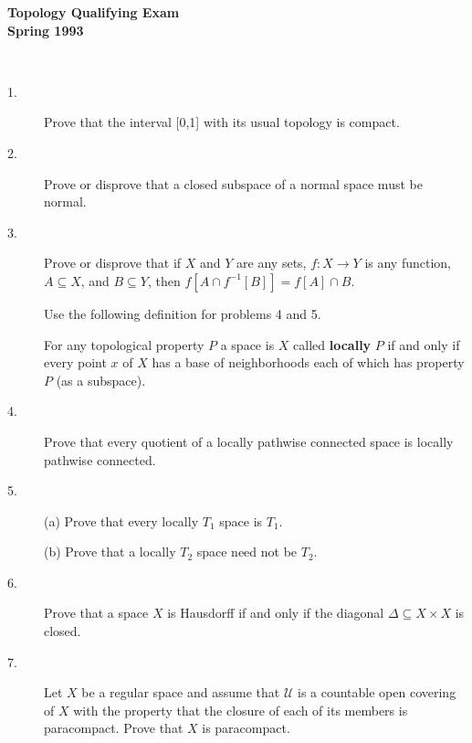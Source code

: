 \documentclass{article}
\begin{document}






\begin{center}\begin{LARGE}
{\bf Topology Qualifying Exam}\\ 
{\bf Spring 1993}\\ \end{LARGE}
\end{center}
\vspace{0.1in}
\noindent\hrulefill\\

\begin{description}
\item[1.]
Prove that the interval [0,1] with its usual topology is compact.

\item[2.]
Prove or disprove that a closed subspace of a normal space must be normal.

\item[3.]
Prove or disprove that if $X$ and $Y$ are any sets, $f : X \to Y$ is any
function, $A \subseteq X$, and $B \subseteq Y$, then
$f[A \cap f^{-1} [B]] = f[A] \cap B$.

Use the following definition for problems 4 and 5.

For any topological property $P$ a space is $X$ called {\bf locally} $P$
if and only if every point $x$ of $X$ has a base of neighborhoods each of
which has property $P$ (as a subspace).

\item[4.]
Prove that every quotient of a locally pathwise connected space is locally
pathwise connected.

\item[5.] (a)
Prove that every locally $T_1$ space is $T_1$.

\item[\quad] (b)
Prove that a locally $T_2$ space need not be $T_2$.

\item[6.]
Prove that a space $X$ is Hausdorff if and only if the diagonal
$\Delta \subseteq X \times X$ is closed.

\item[7.]
Let $X$ be a regular space and assume that $\mathcal U$ is a countable open
covering of $X$ with the property that the closure of each of its members is
paracompact. Prove that $X$ is paracompact.


\end{description}
\end{document}
